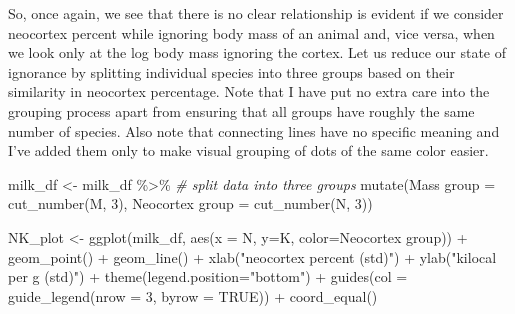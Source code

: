 \documentclass[
]{book}
\newenvironment{Shaded}{\begin{snugshade}}{\end{snugshade}}
\newcommand{\AttributeTok}[1]{\textcolor[rgb]{0.77,0.63,0.00}{#1}}
\newcommand{\CommentTok}[1]{\textcolor[rgb]{0.56,0.35,0.01}{\textit{#1}}}
\newcommand{\ConstantTok}[1]{\textcolor[rgb]{0.00,0.00,0.00}{#1}}
\newcommand{\DecValTok}[1]{\textcolor[rgb]{0.00,0.00,0.81}{#1}}
\newcommand{\FunctionTok}[1]{\textcolor[rgb]{0.00,0.00,0.00}{#1}}
\newcommand{\NormalTok}[1]{#1}
\newcommand{\OtherTok}[1]{\textcolor[rgb]{0.56,0.35,0.01}{#1}}
\newcommand{\SpecialCharTok}[1]{\textcolor[rgb]{0.00,0.00,0.00}{#1}}
\newcommand{\StringTok}[1]{\textcolor[rgb]{0.31,0.60,0.02}{#1}}
\begin{document}
So, once again, we see that there is no clear relationship is evident if we consider neocortex percent while ignoring body mass of an animal and, vice versa, when we look only at the log body mass ignoring the cortex. Let us reduce our state of ignorance by splitting individual species into three groups based on their similarity in neocortex percentage. Note that I have put no extra care into the grouping process apart from ensuring that all groups have roughly the same number of species. Also note that connecting lines have no specific meaning and I've added them only to make visual grouping of dots of the same color easier.

\begin{Shaded}
\begin{Highlighting}[]
\NormalTok{milk\_df }\OtherTok{\textless{}{-}} 
\NormalTok{  milk\_df }\SpecialCharTok{\%\textgreater{}\%}
  \CommentTok{\# split data into three groups}
  \FunctionTok{mutate}\NormalTok{(}\StringTok{\textasciigrave{}}\AttributeTok{Mass group}\StringTok{\textasciigrave{}} \OtherTok{=} \FunctionTok{cut\_number}\NormalTok{(M, }\DecValTok{3}\NormalTok{), }
         \StringTok{\textasciigrave{}}\AttributeTok{Neocortex group}\StringTok{\textasciigrave{}} \OtherTok{=} \FunctionTok{cut\_number}\NormalTok{(N, }\DecValTok{3}\NormalTok{))}

\NormalTok{NK\_plot }\OtherTok{\textless{}{-}} 
  \FunctionTok{ggplot}\NormalTok{(milk\_df, }\FunctionTok{aes}\NormalTok{(}\AttributeTok{x =}\NormalTok{ N, }\AttributeTok{y=}\NormalTok{K, }\AttributeTok{color=}\StringTok{\textasciigrave{}}\AttributeTok{Neocortex group}\StringTok{\textasciigrave{}}\NormalTok{)) }\SpecialCharTok{+} 
  \FunctionTok{geom\_point}\NormalTok{() }\SpecialCharTok{+}
  \FunctionTok{geom\_line}\NormalTok{() }\SpecialCharTok{+}
  \FunctionTok{xlab}\NormalTok{(}\StringTok{"neocortex percent (std)"}\NormalTok{) }\SpecialCharTok{+} 
  \FunctionTok{ylab}\NormalTok{(}\StringTok{"kilocal per g (std)"}\NormalTok{) }\SpecialCharTok{+}
  \FunctionTok{theme}\NormalTok{(}\AttributeTok{legend.position=}\StringTok{"bottom"}\NormalTok{) }\SpecialCharTok{+}
  \FunctionTok{guides}\NormalTok{(}\AttributeTok{col =} \FunctionTok{guide\_legend}\NormalTok{(}\AttributeTok{nrow =} \DecValTok{3}\NormalTok{, }\AttributeTok{byrow =} \ConstantTok{TRUE}\NormalTok{)) }\SpecialCharTok{+}
  \FunctionTok{coord\_equal}\NormalTok{()}


\end{Highlighting}
\end{Shaded}
\end{document}
